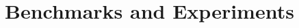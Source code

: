 \documentclass{article}
\theoremstyle{definition}
\theoremstyle{remark}
\newif\ifaddcomments
\newcommand{\todo}[1]{\ifaddcomments{\textcolor{red}{[TODO: #1]}}\fi}
\newcommand{\roni}[1]{\ifaddcomments{\textcolor{red}{[Roni: #1]}}\fi}
\newcommand{\yarin}[1]{\ifaddcomments{\textcolor{teal}{[Yarin: #1]}}\fi}
\begin{document}






\section{Benchmarks and Experiments}

\todo{Leonardo is in charge of this section.}

\todo{Describe the benchmark suite and how to use it.}

\todo{If we have time: show results for at least some of the algorithms on the benchmark suite.}
\end{document}
